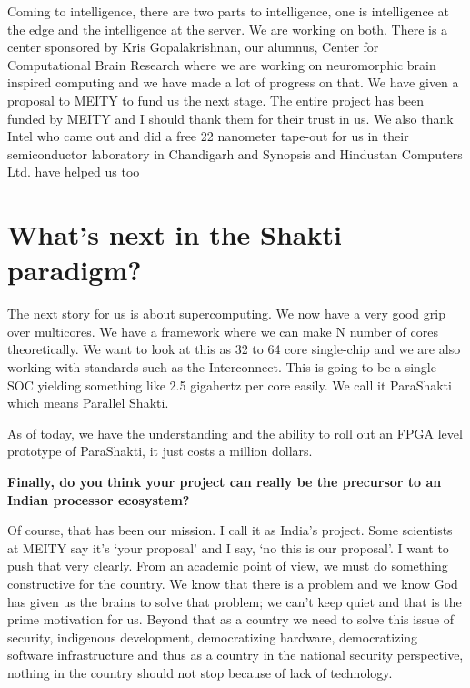 \begin{multicols}{2}
Coming to intelligence, there are two parts to intelligence, one is intelligence at the edge and the intelligence at the server. We are working on both. There is a center sponsored by Kris Gopalakrishnan, our alumnus, Center for Computational Brain Research where we are working on neuromorphic brain inspired computing and we have made a lot of progress on that. We have given a proposal to MEITY to fund us the next stage. The entire project has been funded by MEITY and I should thank them for their trust in us. We also thank Intel who came out and did a free 22 nanometer tape-out for us in their semiconductor laboratory in Chandigarh and Synopsis and Hindustan Computers Ltd. have helped us too 

\section*{What's next in the Shakti paradigm?}

The next story for us is about supercomputing. We now have a very good grip over multicores. We have a framework where we can make N number of cores theoretically. We want to look at this as 32 to 64 core single-chip and we are also working with standards such as the Interconnect. This is going to be a single SOC yielding something like 2.5 gigahertz per core easily. We call it ParaShakti which means Parallel Shakti. 

As of today, we have the understanding and the ability to roll out an FPGA level prototype of ParaShakti, it just costs a million dollars.


\noindent
{\bf Finally, do you think your project can really be the precursor to an Indian processor ecosystem?}


  Of course, that has been our mission. I call it as India's project. Some scientists at MEITY say it's `your proposal' and I say, `no this is our proposal'. I want to push that very clearly. From an academic point of view, we must do something constructive for the country. We know that there is a problem and we know God has given us the brains to solve that problem; we can't keep quiet and that is the prime motivation for us. Beyond that as a country we need to solve this issue of security, indigenous development, democratizing hardware, democratizing software infrastructure and thus as a country in the national security perspective, nothing in the country should not stop because of lack of technology.


\end{multicols}
